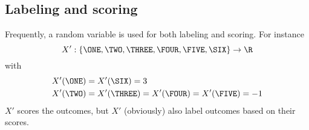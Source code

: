 \newpage
\subsection{Labeling and scoring}

Frequently,
a random variable is used for both labeling and scoring.
For instance
\[
  X' : \{ \ONE, \TWO, \THREE, \FOUR, \FIVE, \SIX \} \rightarrow \R
\]
with
\begin{align*}
  X'(\ONE) &= X'(\SIX) = 3 \\
  X'(\TWO) &= X'(\THREE) = X'(\FOUR) = X'(\FIVE) = -1 
\end{align*}
$X'$ scores the outcomes, but $X'$ (obviously)
also label outcomes based on their scores.



 
